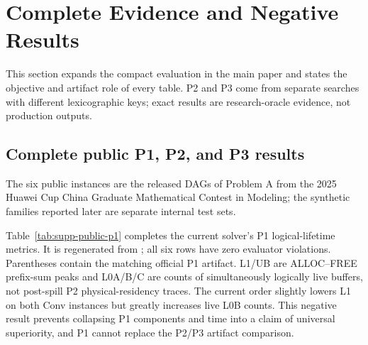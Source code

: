 \section{Complete Evidence and Negative Results}\label{sec:supp-cgo}

This section expands the compact evaluation in the main paper and states the objective and artifact role of every table. P2 and P3 come from separate searches with different lexicographic keys; exact results are research-oracle evidence, not production outputs.

\subsection{Complete public P1, P2, and P3 results}\label{sec:supp-public}

The six public instances are the released DAGs of Problem A from the 2025
Huawei Cup China Graduate Mathematical Contest in Modeling; the synthetic
families reported later are separate internal test sets.

Table~\ref{tab:supp-public-p1} completes the current solver's P1 logical-lifetime metrics. It is regenerated from ; all six rows have zero evaluator violations. Parentheses contain the matching official P1 artifact. L1/UB are ALLOC--FREE prefix-sum peaks and L0A/B/C are counts of simultaneously logically live buffers, not post-spill P2 physical-residency traces. The current order slightly lowers L1 on both Conv instances but greatly increases live L0B counts. This negative result prevents collapsing P1 components and time into a claim of universal superiority, and P1 cannot replace the P2/P3 artifact comparison.

\begin{table}[htbp]\centering
\caption{P1 logical metrics on the six public instances, reported as ours (official). Time is evaluator-computed schedule cycles.}
\label{tab:supp-public-p1}
\end{table}

